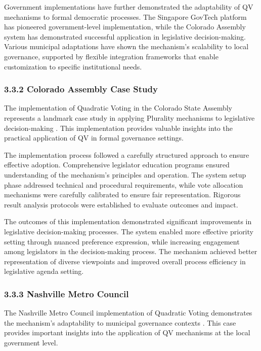 Government implementations have further demonstrated the adaptability of QV mechanisms to formal democratic processes. The Singapore GovTech platform has pioneered government-level implementation, while the Colorado Assembly system has demonstrated successful application in legislative decision-making. Various municipal adaptations have shown the mechanism's scalability to local governance, supported by flexible integration frameworks that enable customization to specific institutional needs.

\hypertarget{colorado-assembly-case-study}{%
\subsubsection{3.3.2 Colorado Assembly Case Study}\label{colorado-assembly-case-study}}

The implementation of Quadratic Voting in the Colorado State Assembly represents a landmark case study in applying Plurality mechanisms to legislative decision-making \citep{coloradoqv2019}. This implementation provides valuable insights into the practical application of QV in formal governance settings.

The implementation process followed a carefully structured approach to ensure effective adoption. Comprehensive legislator education programs ensured understanding of the mechanism's principles and operation. The system setup phase addressed technical and procedural requirements, while vote allocation mechanisms were carefully calibrated to ensure fair representation. Rigorous result analysis protocols were established to evaluate outcomes and impact.

The outcomes of this implementation demonstrated significant improvements in legislative decision-making processes. The system enabled more effective priority setting through nuanced preference expression, while increasing engagement among legislators in the decision-making process. The mechanism achieved better representation of diverse viewpoints and improved overall process efficiency in legislative agenda setting.

\hypertarget{nashville-metro-council}{%
\subsubsection{3.3.3 Nashville Metro Council}\label{nashville-metro-council}}

The Nashville Metro Council implementation of Quadratic Voting demonstrates the mechanism's adaptability to municipal governance contexts \citep{coloradoqv2019}. This case provides important insights into the application of QV mechanisms at the local government level.

